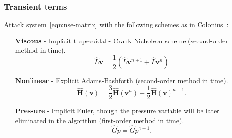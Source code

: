 \documentclass{article}
\begin{document}
\subsubsection{Transient terms}\label{subsec:transient}
Attack system~\eqref{eqn:nse-matrix} with the following schemes as in Colonius~\cite{Colonius:2008}:
\begin{enumerate}
	\item[\textbf{Viscous}] - Implicit trapezoidal - Crank Nicholson scheme (second-order method in time).  
	\begin{equation}\label{eqn:viscous-crank-nicholson}
  		\hat{L}\boldsymbol{v}=\frac{1}{2}\left(\hat{L}\boldsymbol{v}^{n+1}+\hat{L}\boldsymbol{v}^n\right)
	\end{equation}

	\item[\textbf{Nonlinear}] - Explicit Adams-Bashforth (second-order method in time).
	\begin{equation}\label{eqn:nonlinear-adams-bashforth}
		\mathbf{\hat{H}}(\boldsymbol{v}) = \frac{3}{2}\mathbf{\hat{H}}(\boldsymbol{v}^{n}) - \frac{1}{2}\mathbf{\hat{H}}(\boldsymbol{v})^{n-1}.
	\end{equation}

	\item[\textbf{Pressure}] - Implicit Euler, though the pressure variable will be later eliminated in the algorithm (first-order method in time). 
	\begin{equation}\label{eqn:pressure-implicit-euler} 
		\hat{G}p = \hat{G}p^{n+1}.
	\end{equation}
\end{enumerate}
\end{document}
